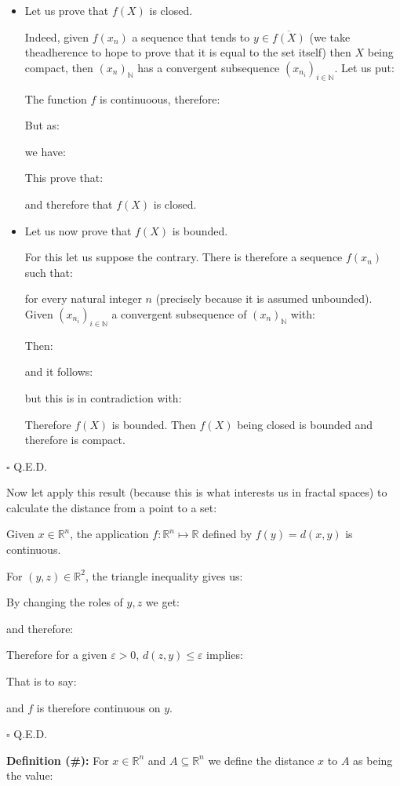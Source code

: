 	\begin{dem}
	\begin{itemize}
		\item Let us prove that $f (X)$ is closed.

		Indeed, given $f(x_n)$ a sequence that tends to $y\in \overline{f(X)}$ (we take theadherence to hope to prove that it is equal to the set itself) then $X$ being compact, then $(x_n)_\mathbb{N}$ has a convergent subsequence $(x_{n_i})_{i\in \mathbb{N}}$.
		Let us put:
		
		The function $f$ is continuoous, therefore:
		
		But as:
		
		we have:
		
		This prove that:
		
		and therefore that $f(X)$ is closed.
	
	\item Let us now prove that $f (X)$ is bounded.

		For this let us suppose the contrary. There is therefore a sequence $f(x_n)$ such that:
		
		for every natural integer $n$ (precisely because it is assumed unbounded). Given $(x_{n_i})_{i\in \mathbb{N}}$ a convergent subsequence of $(x_n)_\mathbb{N}$ with:
		
		Then:
		
		and it follows:
		
		but this is in contradiction with:
		
		Therefore $f(X)$ is bounded. Then $f(X)$ being closed is bounded and therefore is compact.
	\end{itemize}
	\begin{flushright}
		$\square$  Q.E.D.
	\end{flushright}
	\end{dem}
		Now let apply this result (because this is what interests us in fractal spaces) to calculate the distance from a point to a set:
	\begin{theorem}
	Given $x\in \mathbb{R}^n$, the application $f:\mathbb{R}^n \mapsto \mathbb{R}$ defined by $f (y) = d (x, y)$ is continuous.
	\end{theorem}
	\begin{dem}
	For $(y,z)\in\mathbb{R}^2$, the triangle inequality gives us:
	
	By changing the roles of $y, z$ we get:
	
	and therefore:
	
	Therefore for a given $\varepsilon >0$, $d(z,y)\leq \varepsilon$ implies:
	
	That is to say:
	
	and $f$ is therefore continuous on $y$.
	\begin{flushright}
		$\square$  Q.E.D.
	\end{flushright}
	\end{dem}
	\textbf{Definition (\#\mydef):} For $x\in \mathbb{R}^n$ and $A\subseteq \mathbb{R}^n$ we define the distance $x$ to $A$ as being the value:
	
